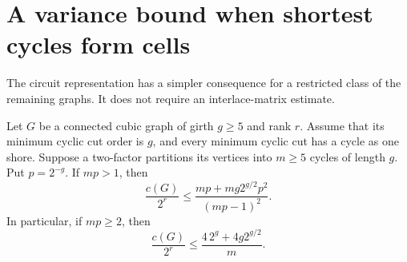 \section{A variance bound when shortest cycles form cells}
\label{sec:random-cycle-cell-variance}

The circuit representation has a simpler consequence for a restricted class of the remaining graphs.
It does not require an interlace-matrix estimate.

\begin{theorem}
\label{thm:random-shortest-cycle-cells}
Let $G$ be a connected cubic graph of girth $g\ge5$ and rank $r$.
Assume that its minimum cyclic cut order is $g$, and every minimum cyclic cut has a cycle as one shore.
Suppose a two-factor partitions its vertices into $m\ge5$ cycles of length $g$.
Put $p=2^{-g}$.
If $mp>1$, then
\[
 \frac{c(G)}{2^r}
 \le
 \frac{mp+mg2^{g/2}p^2}{(mp-1)^2}.
\]
In particular, if $mp\ge2$, then
\[
 \frac{c(G)}{2^r}
 \le \frac{4\,2^g+4g2^{g/2}}{m}.
\]
\end{theorem}

